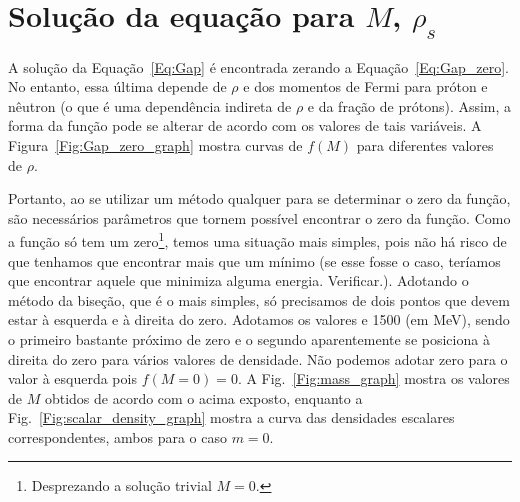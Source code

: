 \section{Solução da equação para $M$, $\rho_s$}

A solução da Equação~\eqref{Eq:Gap} é encontrada zerando a Equação~\eqref{Eq:Gap_zero}. No entanto, essa última depende de $\rho$ e dos momentos de Fermi para próton e nêutron (o que é uma dependência indireta de $\rho$ e da fração de prótons). Assim, a forma da função pode se alterar de acordo com os valores de tais variáveis. A Figura~\ref{Fig:Gap_zero_graph} mostra curvas de $f(M)$ para diferentes valores de $\rho$.

\begin{figure*}
	
	\caption{Exemplos de formas diferentes para $f(M)$ para valores diferentes de $\rho$. Os momentos de Fermi foram determinados a partir de \eqref{Eq:Mom_Fermi_a_partir_de_rho} com fração de prótons 1/2. \protect}
	\label{Fig:Gap_zero_graph}
\end{figure*}

Portanto, ao se utilizar um método qualquer para se determinar o zero da função, são necessários parâmetros que tornem possível encontrar o zero da função. Como a função só tem um zero\footnote[][1cm]{Desprezando a solução trivial $M = 0$.}, temos uma situação mais simples, pois não há risco de que tenhamos que encontrar mais que um mínimo (se esse fosse o caso, teríamos que encontrar aquele que minimiza alguma energia\cite{Buballa}. Verificar.). Adotando o método da biseção, que é o mais simples, só precisamos de dois pontos que devem estar à esquerda e à direita do zero. Adotamos os valores  e 1500 (em MeV), sendo o primeiro bastante próximo de zero e o segundo aparentemente se posiciona à direita do zero para vários valores de densidade. Não podemos adotar zero para o valor à esquerda pois $f(M=0) = 0$. A Fig.~\ref{Fig:mass_graph} mostra os valores de $M$ obtidos de acordo com o acima exposto, enquanto a Fig.~\ref{Fig:scalar_density_graph} mostra a curva das densidades escalares correspondentes, ambos para o caso $m = 0$.

\begin{figure*}
	
	\caption{Gráfico mostrando a massa em função da densidade bariônica para fração de prótons 1/2. Note que $M$ diminui até zero em $\rho \approx 0.35$. Nesse ponto ocorre a restauração da simetria quiral. \protect}
	\label{Fig:mass_graph}
\end{figure*}

